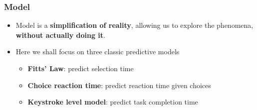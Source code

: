 \documentclass{beamer}
\begin{document}
\begin{frame}
	\frametitle{Model}
	\begin{itemize}
		\item Model is a \textbf{simplification of reality}, allowing us to explore the phenomena, \textbf{without actually doing it}.
		\item Here we shall focus on three classic predictive models
		\begin{itemize}
			\item \textbf{Fitts' Law}: predict selection time
			\item \textbf{Choice reaction time}: predict reaction time given choices
			\item \textbf{Keystroke level model}: predict task completion time
		\end{itemize}
	\end{itemize}
\end{frame}
\end{document}
